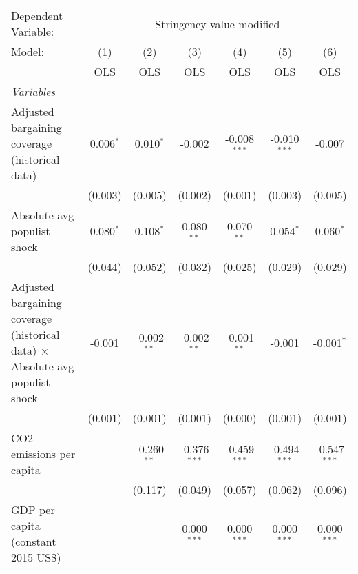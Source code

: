 
\begingroup
\centering
\begin{tabular}{lcccccc}
   \toprule
   Dependent Variable: & \multicolumn{6}{c}{Stringency value modified}\\
   Model:                                                                               & (1)         & (2)           & (3)            & (4)            & (5)            & (6)\\  
                                                                                        &  OLS        & OLS           & OLS            & OLS            & OLS            & OLS\\  
   \midrule
   \emph{Variables}\\
   Adjusted bargaining coverage (historical data)                                       & 0.006$^{*}$ & 0.010$^{*}$   & -0.002         & -0.008$^{***}$ & -0.010$^{***}$ & -0.007\\   
                                                                                        & (0.003)     & (0.005)       & (0.002)        & (0.001)        & (0.003)        & (0.005)\\   
   Absolute avg populist shock                                                          & 0.080$^{*}$ & 0.108$^{*}$   & 0.080$^{**}$   & 0.070$^{**}$   & 0.054$^{*}$    & 0.060$^{*}$\\   
                                                                                        & (0.044)     & (0.052)       & (0.032)        & (0.025)        & (0.029)        & (0.029)\\   
   Adjusted bargaining coverage (historical data) $\times$ Absolute avg populist shock  & -0.001      & -0.002$^{**}$ & -0.002$^{**}$  & -0.001$^{**}$  & -0.001         & -0.001$^{*}$\\   
                                                                                        & (0.001)     & (0.001)       & (0.001)        & (0.000)        & (0.001)        & (0.001)\\   
   CO2 emissions per capita                                                             &             & -0.260$^{**}$ & -0.376$^{***}$ & -0.459$^{***}$ & -0.494$^{***}$ & -0.547$^{***}$\\   
                                                                                        &             & (0.117)       & (0.049)        & (0.057)        & (0.062)        & (0.096)\\   
   GDP per capita (constant 2015 US\$)                                                  &             &               & 0.000$^{***}$  & 0.000$^{***}$  & 0.000$^{***}$  & 0.000$^{***}$\\   

\end{tabular}
